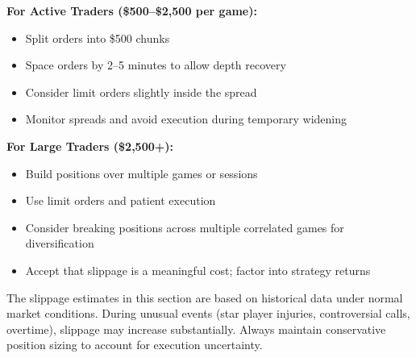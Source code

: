 \textbf{For Active Traders (\$500--\$2,500 per game):}
\begin{itemize}
    \item Split orders into \$500 chunks
    \item Space orders by 2--5 minutes to allow depth recovery
    \item Consider limit orders slightly inside the spread
    \item Monitor spreads and avoid execution during temporary widening
\end{itemize}

\textbf{For Large Traders (\$2,500+):}
\begin{itemize}
    \item Build positions over multiple games or sessions
    \item Use limit orders and patient execution
    \item Consider breaking positions across multiple correlated games for diversification
    \item Accept that slippage is a meaningful cost; factor into strategy returns
\end{itemize}

\begin{warningbox}
The slippage estimates in this section are based on historical data under normal market conditions. During unusual events (star player injuries, controversial calls, overtime), slippage may increase substantially. Always maintain conservative position sizing to account for execution uncertainty.
\end{warningbox}
